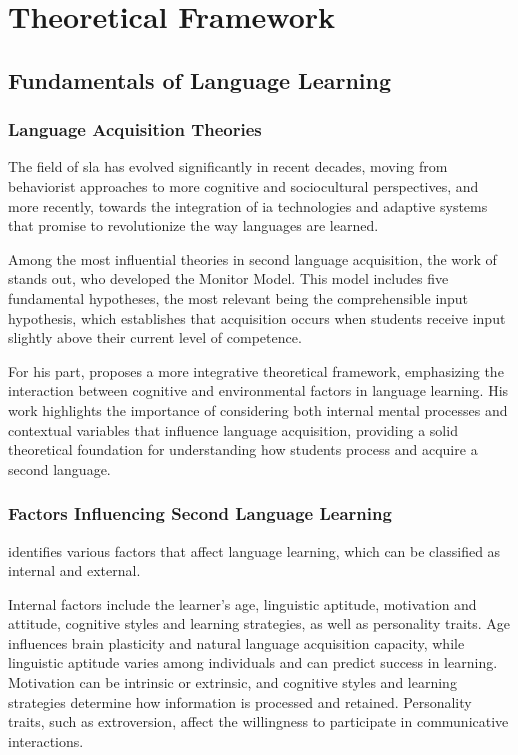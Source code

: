 \chapter{Theoretical Framework}
\label{theoretical-framework}

\section{Fundamentals of Language Learning}

\subsection{Language Acquisition Theories}

The field of \gls{sla} has evolved significantly in recent decades, moving from behaviorist approaches to more cognitive and sociocultural perspectives, and more recently, towards the integration of \gls{ia} technologies and adaptive systems that promise to revolutionize the way languages are learned.

Among the most influential theories in second language acquisition, the work of \cite{krashen1982principles} stands out, who developed the Monitor Model. This model includes five fundamental hypotheses, the most relevant being the comprehensible input hypothesis, which establishes that acquisition occurs when students receive input slightly above their current level of competence.

For his part, \cite{ellis1994study} proposes a more integrative theoretical framework, emphasizing the interaction between cognitive and environmental factors in language learning. His work highlights the importance of considering both internal mental processes and contextual variables that influence language acquisition, providing a solid theoretical foundation for understanding how students process and acquire a second language.

\subsection{Factors Influencing Second Language Learning}

\cite{ellis1994study} identifies various factors that affect language learning, which can be classified as internal and external.

Internal factors include the learner's age, linguistic aptitude, motivation and attitude, cognitive styles and learning strategies, as well as personality traits. Age influences brain plasticity and natural language acquisition capacity, while linguistic aptitude varies among individuals and can predict success in learning. Motivation can be intrinsic or extrinsic, and cognitive styles and learning strategies determine how information is processed and retained. Personality traits, such as extroversion, affect the willingness to participate in communicative interactions.

